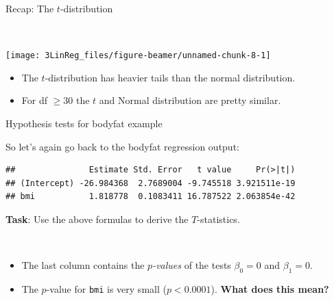 \documentclass[10pt,ignorenonframetext,]{beamer}
\newenvironment{Shaded}{\begin{snugshade}}{\end{snugshade}}
\newcommand{\KeywordTok}[1]{\textcolor[rgb]{0.13,0.29,0.53}{\textbf{#1}}}
\newcommand{\OperatorTok}[1]{\textcolor[rgb]{0.81,0.36,0.00}{\textbf{#1}}}
\newcommand{\NormalTok}[1]{#1}
\providecommand{\tightlist}{%
  \setlength{\itemsep}{0pt}\setlength{\parskip}{0pt}}
\begin{document}
\begin{frame}

\begin{block}{Recap: The \(t\)-distribution}

\(~\)

\begin{center}\texttt{[image: 3LinReg\_files/figure-beamer/unnamed-chunk-8-1]} \end{center}

\normalsize

\begin{itemize}
\tightlist
\item
  The \(t\)-distribution has heavier tails than the normal distribution.
\item
  For df \(\geq 30\) the \(t\) and Normal distribution are pretty
  similar.
\end{itemize}

\end{block}

\end{frame}

\begin{frame}[fragile]

\begin{block}{Hypothesis tests for bodyfat example}

\vspace{2mm}

So let's again go back to the bodyfat regression output:

\small

\begin{Shaded}
\end{Shaded}

\begin{verbatim}
##               Estimate Std. Error   t value     Pr(>|t|)
## (Intercept) -26.984368  2.7689004 -9.745518 3.921511e-19
## bmi           1.818778  0.1083411 16.787522 2.063854e-42
\end{verbatim}

\normalsize

\textbf{Task}: Use the above formulas to derive the \(T\)-statistics.

\(~\)

\begin{itemize}
\item
  The last column contains the \emph{\(p\)-values} of the tests
  \(\beta_0=0\) and \(\beta_1=0\).
\item
  The \(p\)-value for \texttt{bmi} is very small (\(p<0.0001\)).
  \textbf{What does this mean?}
\end{itemize}

\end{block}

\end{frame}
\end{document}
